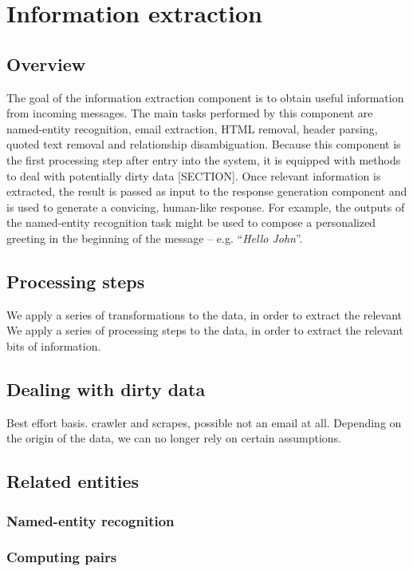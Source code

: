 \chapter{Information extraction}

\section{Overview}
The goal of the information extraction component is to obtain useful information from incoming messages. The main tasks performed by this component are named-entity recognition, email extraction, HTML removal, header parsing, quoted text removal and relationship disambiguation. Because this component is the first processing step after entry into the system, it is equipped with methods to deal with potentially dirty data [SECTION]. Once relevant information is extracted, the result is passed as input to the response generation component and is used to generate a convicing, human-like response. For example, the outputs of the named-entity recognition task might be used to compose a personalized greeting in the beginning of the message -- e.g. ``\textit{Hello John}''.

\section{Processing steps}
We apply a series of transformations to the data, in order to extract the relevant 
We apply a series of processing steps to the data, in order to extract the relevant bits of information.

\section{Dealing with dirty data}
Best effort basis. crawler and scrapes, possible not an email at all.
Depending on the origin of the data, we can no longer rely on certain assumptions.

\section{Related entities}
\subsection{Named-entity recognition}
\subsection{Computing pairs}
